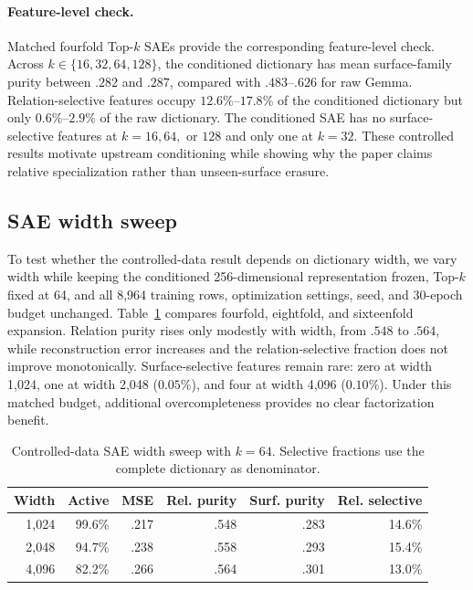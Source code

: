 \documentclass[11pt]{article}
\begin{document}
\paragraph{Feature-level check.}
Matched fourfold Top-$k$ SAEs provide the corresponding feature-level check. Across $k\in\{16,32,64,128\}$, the conditioned dictionary has mean surface-family purity between $.282$ and $.287$, compared with $.483$--$.626$ for raw Gemma. Relation-selective features occupy $12.6\%$--$17.8\%$ of the conditioned dictionary but only $0.6\%$--$2.9\%$ of the raw dictionary. The conditioned SAE has no surface-selective features at $k=16,64,$ or $128$ and only one at $k=32$. These controlled results motivate upstream conditioning while showing why the paper claims relative specialization rather than unseen-surface erasure.

\subsection{SAE width sweep}
To test whether the controlled-data result depends on dictionary width, we vary width while keeping the conditioned 256-dimensional representation frozen, Top-$k$ fixed at 64, and all 8,964 training rows, optimization settings, seed, and 30-epoch budget unchanged. Table~\ref{tab:app-width} compares fourfold, eightfold, and sixteenfold expansion. Relation purity rises only modestly with width, from $.548$ to $.564$, while reconstruction error increases and the relation-selective fraction does not improve monotonically. Surface-selective features remain rare: zero at width 1,024, one at width 2,048 ($0.05\%$), and four at width 4,096 ($0.10\%$). Under this matched budget, additional overcompleteness provides no clear factorization benefit.

\begin{table}[H]
\centering\scriptsize
\caption{Controlled-data SAE width sweep with $k=64$. Selective fractions use the complete dictionary as denominator.}
\label{tab:app-width}
\begin{tabular*}{\columnwidth}{@{\extracolsep{\fill}}rrrrrr@{}}
\toprule
Width & Active & MSE & Rel. purity & Surf. purity & Rel. selective \\
\midrule
1,024 & 99.6\% & .217 & .548 & .283 & 14.6\% \\
2,048 & 94.7\% & .238 & .558 & .293 & 15.4\% \\
4,096 & 82.2\% & .266 & .564 & .301 & 13.0\% \\
\bottomrule
\end{tabular*}
\end{table}
\end{document}
